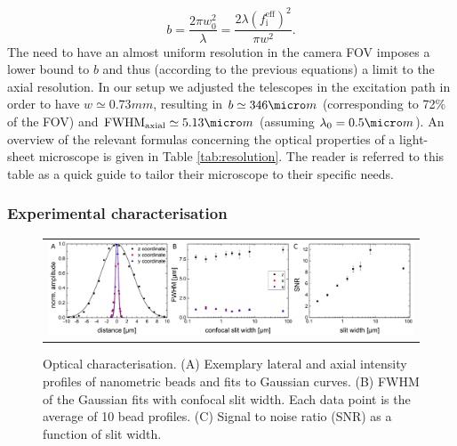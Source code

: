 \documentclass[12pt]{spieman}  %
\begin{document}
\begin{spacing}{2}
\begin{equation}
b = \frac{2\pi w_0^2}{\lambda} = \frac{2 \lambda  {(f_{\text{i}}^{\text{eff}})}^2}{\pi w^2}.
\end{equation}
The need to have an almost uniform resolution in the camera FOV imposes a lower bound to $b$ and thus (according to the previous equations) a limit to the axial resolution. In our setup we adjusted the telescopes in the excitation path in order to have $w \simeq 0.73 mm$, resulting in $b \simeq 346 \micro m$ (corresponding to 72\% of the FOV) and $\text{FWHM}_{\text{axial}} \simeq 5.13 \micro m$ (assuming $\lambda_0 = 0.5 \micro m$). An overview of the relevant formulas concerning the optical properties of a light-sheet microscope is given in Table \ref{tab:resolution}. The reader is referred to this table as a quick guide to tailor their microscope to their specific needs.

\subsubsection{Experimental characterisation}

\begin{figure}
   \begin{center}
   \begin{tabular}{c}
   \includegraphics[width=\textwidth]{panel3.eps}
   \end{tabular}
   \end{center}
   \caption{\label{fig:origin} Optical characterisation. (A) Exemplary lateral and axial intensity profiles of nanometric beads and fits to Gaussian curves. (B) FWHM of the Gaussian fits with confocal slit width. Each data point is the average of 10 bead profiles. (C) Signal to noise ratio (SNR) as a function of slit width.} 
\end{figure}


\end{spacing}
\end{document}
